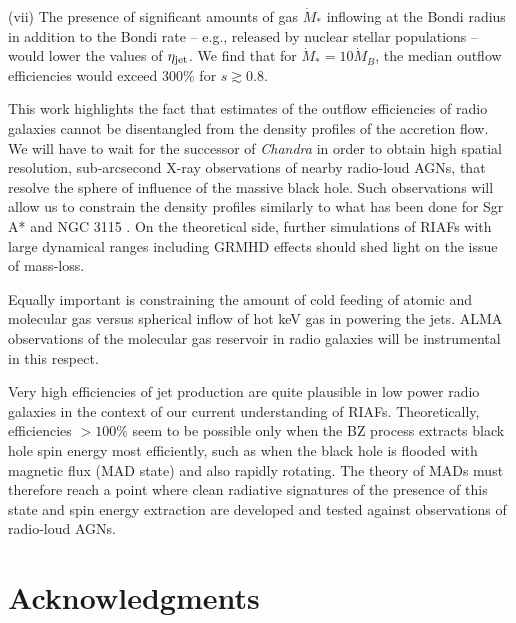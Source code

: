 \documentclass[useAMS,usenatbib]{mn2e}
\begin{document}
(vii) The presence of significant amounts of gas $\dot{M}_*$ inflowing at the Bondi radius in addition to the Bondi rate -- e.g., released by nuclear stellar populations -- would lower the values of $\eta_{\rm jet}$. We find that for $\dot{M}_*=10 \dot{M}_B$, the median outflow efficiencies would exceed 300\% for $s \gtrsim 0.8$.

This work highlights the fact that estimates of the outflow efficiencies of radio galaxies cannot be disentangled from the density profiles of the accretion flow. We will have to wait for the successor of \emph{Chandra} in order to obtain high spatial resolution, sub-arcsecond X-ray observations of nearby radio-loud AGNs, that resolve the sphere of influence of the massive black hole.  Such observations will allow us to constrain the density profiles similarly to what has been done for Sgr A* and NGC 3115 \citep{Wang13,Wong14}. On the theoretical side, further simulations of RIAFs with large dynamical ranges including GRMHD effects should shed light on the issue of mass-loss.

Equally important is constraining the amount of cold feeding of atomic and molecular gas versus spherical inflow of hot keV gas in powering the jets. ALMA observations of the molecular gas reservoir in radio galaxies will be instrumental in this respect. 

Very high efficiencies of jet production are quite plausible in low power radio galaxies in the context of our current understanding of RIAFs. Theoretically, efficiencies $> 100\%$ seem to be possible only when the BZ process extracts black hole spin energy most efficiently, such as when the black hole is flooded with magnetic flux (MAD state) and also rapidly rotating. The theory of MADs must therefore reach a point where clean radiative signatures of the presence of this state and spin energy extraction are developed and tested against observations of radio-loud AGNs. 





\section*{Acknowledgments}
\end{document}
